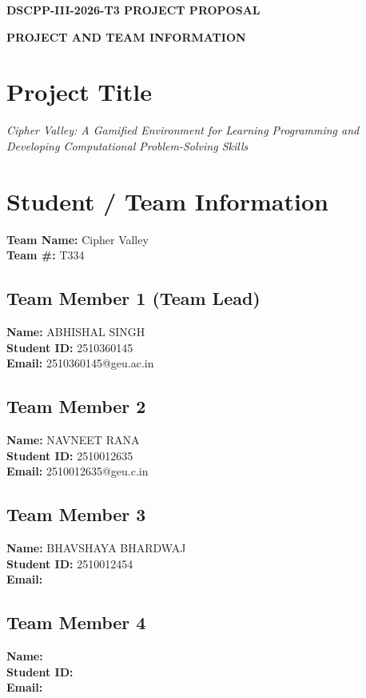 \documentclass[12pt,a4paper]{article}
\begin{document}
\begin{center}
{\Large\bfseries DSCPP-III-2026-T3 PROJECT PROPOSAL\par}
\vspace{1em}
{\large\bfseries PROJECT AND TEAM INFORMATION\par}
\end{center}

\section*{Project Title}
\textit{Cipher Valley: A Gamified Environment for Learning Programming and Developing Computational Problem-Solving Skills}

\section*{Student / Team Information}

\textbf{Team Name:} Cipher Valley\\
\textbf{Team \#:} T334

\subsection*{Team Member 1 (Team Lead)}
\textbf{Name:} ABHISHAL SINGH\\
\textbf{Student ID:} 2510360145\\
\textbf{Email:} 2510360145@geu.ac.in

\subsection*{Team Member 2}
\textbf{Name:} NAVNEET RANA\\
\textbf{Student ID:} 2510012635\\
\textbf{Email:} 2510012635@geu.c.in

\subsection*{Team Member 3}
\textbf{Name:} BHAVSHAYA BHARDWAJ\\
\textbf{Student ID:} 2510012454\\
\textbf{Email:} 

\subsection*{Team Member 4}
\textbf{Name:} \\
\textbf{Student ID:} \\
\textbf{Email:} 
\end{document}
